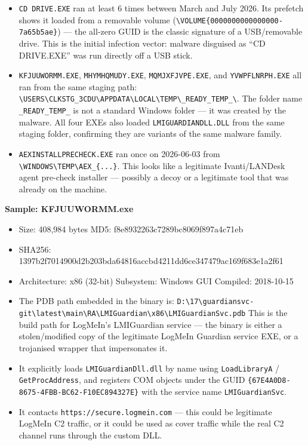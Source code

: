 \documentclass[
]{article}
\providecommand{\tightlist}{%
  \setlength{\itemsep}{0pt}\setlength{\parskip}{0pt}}
\begin{document}
\begin{itemize}
\item
  \texttt{CD\ DRIVE.EXE} ran at least 6 times between March and July
  2026. Its prefetch shows it loaded from a removable volume
  (\texttt{\textbackslash{}VOLUME\{0000000000000000-7a65b5ae\}}) --- the
  all-zero GUID is the classic signature of a USB/removable drive. This
  is the initial infection vector: malware disguised as ``CD DRIVE.EXE''
  was run directly off a USB stick.
\item
  \texttt{KFJUUWORMM.EXE}, \texttt{MHYMHQMUDY.EXE},
  \texttt{MQMJXFJVPE.EXE}, and \texttt{YVWPFLNRPH.EXE} all ran from the
  same staging path:
  \texttt{\textbackslash{}USERS\textbackslash{}CLKSTG\_3CDU\textbackslash{}APPDATA\textbackslash{}LOCAL\textbackslash{}TEMP\textbackslash{}\_READY\_TEMP\_\textbackslash{}}.
  The folder name \texttt{\_READY\_TEMP\_} is not a standard Windows
  folder --- it was created by the malware. All four EXEs also loaded
  \texttt{LMIGUARDIANDLL.DLL} from the same staging folder, confirming
  they are variants of the same malware family.
\item
  \texttt{AEXINSTALLPRECHECK.EXE} ran once on 2026-06-03 from
  \texttt{\textbackslash{}WINDOWS\textbackslash{}TEMP\textbackslash{}AEX\_\{...\}}.
  This looks like a legitimate Ivanti/LANDesk agent pre-check installer
  --- possibly a decoy or a legitimate tool that was already on the
  machine.
\end{itemize}

\textbf{Sample: KFJUUWORMM.exe}

\begin{itemize}
\tightlist
\item
  Size: 408,984 bytes \textbar{} MD5: f8e8932263c7289bc8069f897a4c71eb
\item
  SHA256:
  1397b2f7014900d2b203bda64816accbd4211dd6ce347479ac169f683e1a2f61
\item
  Architecture: x86 (32-bit) \textbar{} Subsystem: Windows GUI
  \textbar{} Compiled: 2018-10-15
\item
  The PDB path embedded in the binary is:
  \texttt{D:\textbackslash{}17\textbackslash{}guardiansvc-git\textbackslash{}latest\textbackslash{}main\textbackslash{}RA\textbackslash{}LMIGuardian\textbackslash{}x86\textbackslash{}LMIGuardianSvc.pdb}
  This is the build path for LogMeIn's LMIGuardian service --- the
  binary is either a stolen/modified copy of the legitimate LogMeIn
  Guardian service EXE, or a trojanised wrapper that impersonates it.
\item
  It explicitly loads \texttt{LMIGuardianDll.dll} by name using
  \texttt{LoadLibraryA} / \texttt{GetProcAddress}, and registers COM
  objects under the GUID
  \texttt{\{67E4A0D8-8675-4FBB-BC62-F10EC894327E\}} with the service
  name \texttt{LMIGuardianSvc}.
\item
  It contacts \texttt{https://secure.logmein.com} --- this could be
  legitimate LogMeIn C2 traffic, or it could be used as cover traffic
  while the real C2 channel runs through the custom DLL.
\end{itemize}
\end{document}
